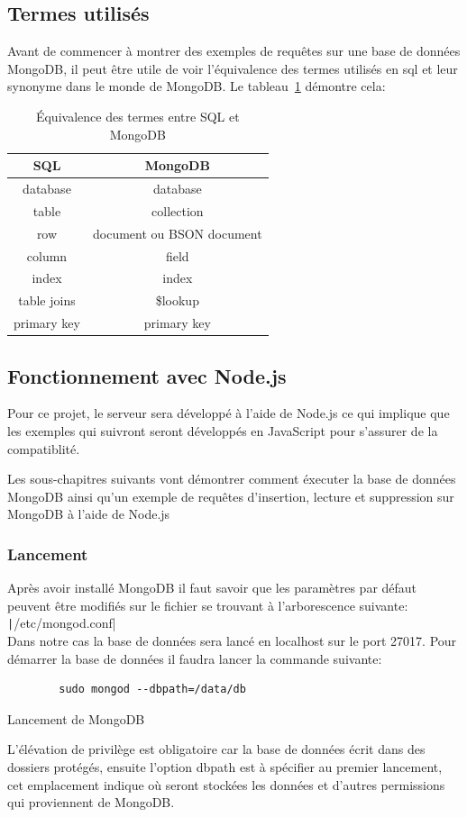 \documentclass[a4paper]{scrreprt}
\begin{document}
\subsection{Termes utilisés}
Avant de commencer à montrer des exemples de requêtes sur une base de données MongoDB, il peut être utile de voir l'équivalence des termes utilisés en \gls{sql} et leur synonyme dans le monde de MongoDB. Le tableau~\ref{table:termes} démontre cela:
\begin{table}[H]
	\centering
	\begin{tabular}{| c | c |}	
    	\hline
        SQL & MongoDB \\ \hline
        database & database \\ \hline
        table & collection \\ \hline
        row & document ou BSON document \\ \hline
        column & field \\ \hline
        index & index \\ \hline 
        table joins & \$lookup \\ \hline 
        primary key & primary key \\ \hline 
  	\end{tabular}
  	\caption{Équivalence des termes entre SQL et MongoDB}
    \label{table:termes}
\end{table}
\subsection{Fonctionnement avec Node.js}
Pour ce projet, le serveur sera développé à l'aide de Node.js ce qui implique que les exemples qui suivront seront développés en JavaScript pour s'assurer de la compatiblité.

Les sous-chapitres suivants vont démontrer comment éxecuter la base de données MongoDB ainsi qu'un exemple de requêtes d'insertion, lecture et suppression sur MongoDB à l'aide de Node.js
\subsubsection{Lancement}
Après avoir installé MongoDB il faut savoir que les paramètres par défaut peuvent être modifiés sur le fichier se trouvant à l'arborescence suivante: \texttt|/etc/mongod.conf| \\
Dans notre cas la base de données sera lancé en localhost sur le port 27017. Pour démarrer la base de données il faudra lancer la commande suivante:\\
\begin{listing}[H]
	\begin{verbatim}
		sudo mongod --dbpath=/data/db
	\end{verbatim}
	\caption{Lancement de MongoDB}
	\label{lst:start_mongoDB}
\end{listing}
L'élévation de privilège est obligatoire car la base de données écrit dans des dossiers protégés, ensuite l'option dbpath est à spécifier au premier lancement, cet emplacement indique où seront stockées les données et d'autres permissions qui proviennent de MongoDB.
\end{document}
